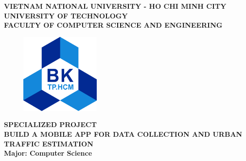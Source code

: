 \documentclass[13pt, a4paper]{article}
\begin{document}

\begin{titlepage}
    \begin{center}
    \normalsize {\textbf{
    VIETNAM NATIONAL UNIVERSITY - HO CHI MINH CITY \\
    UNIVERSITY OF TECHNOLOGY \\
    FACULTY OF COMPUTER SCIENCE AND ENGINEERING}}
    \vspace{1cm}
    
    \begin{figure}[ht]
        \centering
        \includegraphics[width=4cm]{assets/images/Trivia/hcmut.png}
    \end{figure}
    
    \begin{center}
    \textbf{{\large SPECIALIZED PROJECT}}\\
    \vspace{1cm}
    {\fontsize{16}{18}\selectfont
    \textbf{{BUILD A MOBILE APP FOR DATA COLLECTION AND URBAN TRAFFIC ESTIMATION}}\\
    }
    \vspace{1cm}
    \textbf{{\large Major: Computer Science}}
    \end{center}
    
    \vspace{1cm}
    

\end{center}
\end{titlepage}
\end{document}

